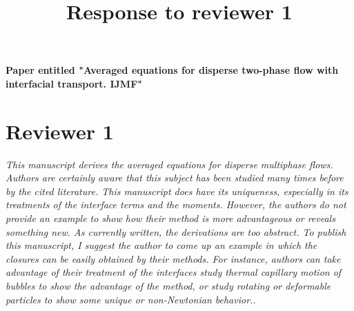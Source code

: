 \documentclass[10pt,a4paper]{article}
\begin{document}
\title{Response to reviewer 1} 
\maketitle
\textbf{Paper entitled "Averaged equations for disperse two-phase flow with interfacial transport. IJMF"}
\bigskip

\section*{Reviewer 1}

\textit{This manuscript derives the averaged equations for disperse multiphase flows. Authors are
certainly aware that this subject has been studied many times before by the cited literature. This
manuscript does have its uniqueness, especially in its treatments of the interface terms and the
moments. However, the authors do not provide an example to show how their method is more
advantageous or reveals something new. As currently written, the derivations are too abstract. To
publish this manuscript, I suggest the author to come up an example in which the closures can be
easily obtained by their methods. For instance, authors can take advantage of their treatment of
the interfaces study thermal capillary motion of bubbles to show the advantage of the method, or
study rotating or deformable particles to show some unique or non-Newtonian behavior..}
\end{document}
